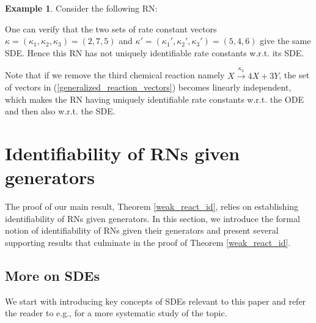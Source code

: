 \documentclass[10pt,a4paper]{amsart}
\theoremstyle{definition}
\newtheorem{example}[theorem]{Example}
\theoremstyle{remark}
\theoremstyle{consequence}
\numberwithin{equation}{section}
\begin{document}
\begin{example}\label{non_ident_generator_multi_dim}
    Consider the following RN:
        \begin{center}
\end{center}

One can verify that the two sets of rate constant vectors $\kappa=(\kappa_1,\kappa_2,\kappa_3) = (2,7,5)$ and $\kappa' = (\kappa_1',\kappa_2',\kappa_3') = (5,4,6)$ give the same SDE. Hence this RN has not uniquely identifiable rate constants w.r.t. its SDE.


Note that if we remove the third chemical reaction namely  $X\xrightarrow{\kappa_3} 4X+3Y$, the set of vectors in (\ref{generalized_reaction_vectors}) becomes linearly independent, which makes the RN having uniquely identifiable rate constants w.r.t. the ODE and then also w.r.t. the SDE.
\end{example}

\section{Identifiability of RNs given generators}
\label{identif_generator}
The proof of our main result, Theorem \ref{weak_react_id}, relies on establishing identifiability of RNs given generators. In this section, we introduce the formal notion of identifiability of RNs given their generators and present several supporting results that culminate in the proof of Theorem \ref{weak_react_id}.


\subsection{More on SDEs}\label{SDEs_theory}
We start with introducing key concepts of SDEs relevant to this paper and refer the reader to e.g., \cite{ikeda1989stochastic,oksendal2013stochastic} for a more systematic study of the topic. 
\end{document}
